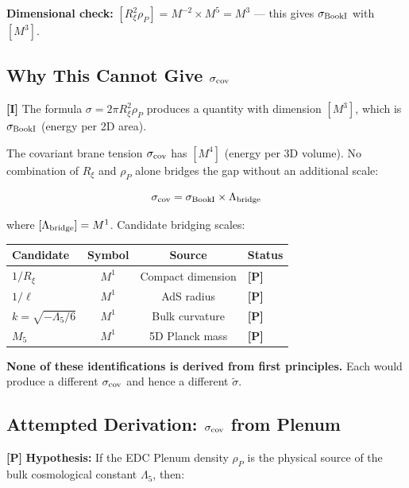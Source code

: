 \documentclass[11pt,a4paper]{article}
\newcommand{\tagI}{\textcolor{mathpurple}{\textbf{[I]}}}
\newcommand{\tagP}{\textcolor{proposedred}{\textbf{[P]}}}
\theoremstyle{definition}
\theoremstyle{remark}
\begin{document}
\textbf{Dimensional check:}
$[R_\xi^2 \rho_P] = M^{-2} \times M^5 = M^3$ \checkmark
--- this gives $\sigma_{\rm BookI}$ with $[M^3]$.

\subsection{Why This Cannot Give $\sigma_{\rm cov}$}

\tagI{} The formula $\sigma = 2\pi R_\xi^2 \rho_P$ produces a quantity
with dimension $[M^3]$, which is $\sigma_{\rm BookI}$ (energy per 2D area).

The covariant brane tension $\sigma_{\rm cov}$ has $[M^4]$ (energy per
3D volume). No combination of $R_\xi$ and $\rho_P$ alone bridges the
gap without an additional scale:

\begin{equation}
\sigma_{\rm cov} = \sigma_{\rm BookI} \times \Lambda_{\rm bridge}
\end{equation}

where $[\Lambda_{\rm bridge}] = M^1$. Candidate bridging scales:

\begin{center}
\renewcommand{\arraystretch}{1.2}
\begin{tabular}{lccl}
\toprule
\textbf{Candidate} & \textbf{Symbol} & \textbf{Source} & \textbf{Status} \\
\midrule
$1/R_\xi$ & $M^1$ & Compact dimension & \tagP \\
$1/\ell$ & $M^1$ & AdS radius & \tagP \\
$k = \sqrt{-\Lambda_5/6}$ & $M^1$ & Bulk curvature & \tagP \\
$M_5$ & $M^1$ & 5D Planck mass & \tagP \\
\bottomrule
\end{tabular}
\end{center}

\textbf{None of these identifications is derived from first principles.}
Each would produce a different $\sigma_{\rm cov}$ and hence a different
$\tilde\sigma$.

\subsection{Attempted Derivation: $\sigma_{\rm cov}$ from Plenum}

\tagP{} \textbf{Hypothesis:} If the EDC Plenum density $\rho_P$
is the physical source of the bulk cosmological constant $\Lambda_5$,
then:
\end{document}
